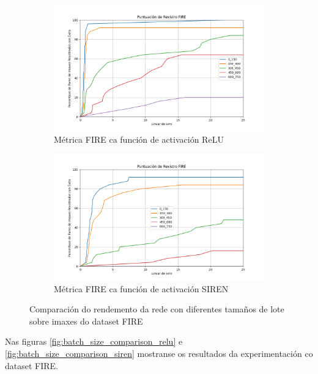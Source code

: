 \begin{figure}[tbp]
    \centering
    \begin{subfigure}[b]{0.5\textwidth}
        \centering
        \includegraphics[width=\textwidth]{imaxes/FIRE_scores/fire_registration_scores_RFMID_MLP.png}
        \caption{Métrica FIRE ca función de activación ReLU}
        \label{fig:FIRERFMID_relu}
    \end{subfigure}\hfill
    \begin{subfigure}[b]{0.5\textwidth}
        \centering
        \includegraphics[width=\textwidth]{imaxes/FIRE_scores/fire_registration_scores_RMIFD_SIREN.png}
        \caption{Métrica FIRE ca función de activación SIREN}
        \label{fig:FIRERFMID_SIREN}
    \end{subfigure}
    \caption{Comparación do rendemento da rede con diferentes tamaños de lote sobre imaxes do dataset FIRE}
    \label{fig:FIRERFMID_scores}
\end{figure}


Nas figuras \ref{fig:batch_size_comparison_relu} e \ref{fig:batch_size_comparison_siren} mostranse os resultados da experimentación co dataset FIRE.

